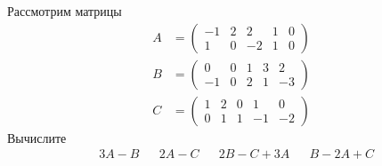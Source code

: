 \begin{exercise}
Рассмотрим матрицы
\begin{align*}
	A&=\begin{pmatrix}
		-1 & 2 & 2 & 1 & 0 \\ 1 & 0 & -2 & 1 & 0
	\end{pmatrix} \\
	B&=\begin{pmatrix}
		0 & 0 & 1 & 3 & 2 \\ -1 & 0 & 2 & 1 & -3
	\end{pmatrix} \\
	C&=\begin{pmatrix}
		1 & 2 & 0 & 1 & 0 \\ 0 & 1 & 1 & -1 & -2
	\end{pmatrix}
\end{align*}
Вычислите
\begin{align*}
	& 3A-B & &2A-C & &2B-C+3A & &B-2A+C
\end{align*}
\end{exercise}